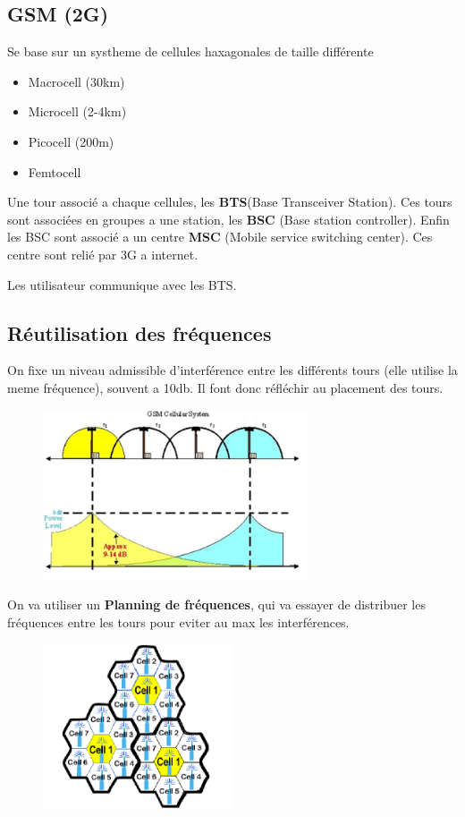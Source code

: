 \documentclass[12pt]{article}
\begin{document}
	\subsection{GSM (2G)}
		Se base sur un systheme de cellules haxagonales de taille différente
		\begin{itemize}
			\item Macrocell (30km)
			\item Microcell (2-4km)
			\item Picocell (200m)
			\item Femtocell
		\end{itemize}
		
		Une tour associé a chaque cellules, les \textbf{BTS}(Base Transceiver Station). Ces tours sont associées en groupes a une station, les \textbf{BSC} (Base station controller). Enfin les BSC sont associé a un centre \textbf{MSC} (Mobile service switching center). Ces centre sont relié par 3G a internet.
		
		Les utilisateur communique avec les BTS.
		
	\subsection{Réutilisation des fréquences}
			On fixe un niveau admissible d'interférence entre les différents tours (elle utilise la meme fréquence), souvent a 10db. Il font donc réfléchir au placement des tours.
			\begin{figure}[H]
				\centering
				\includegraphics[width=0.7\textwidth]{img/CM/RF.png}
			\end{figure}
			
			On va utiliser un \textbf{Planning de fréquences}, qui va essayer de distribuer les fréquences entre les tours pour eviter au max les interférences.
 
 			\begin{figure}[H]
				\centering
				\includegraphics[width=0.5\textwidth]{img/CM/PF.png}
			\end{figure}
			
\end{document}
